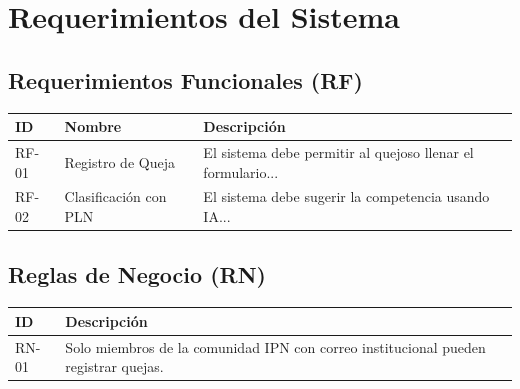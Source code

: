 \chapter{Requerimientos del Sistema}
\label{cap:requerimientos}

\section{Requerimientos Funcionales (RF)}
\begin{table}[htbp]
    \centering
    \begin{tabular}{|l|l|p{8cm}|}
    \hline
    \textbf{ID} & \textbf{Nombre} & \textbf{Descripción} \\ \hline
    \label{RF-01} RF-01 & Registro de Queja & El sistema debe permitir al quejoso llenar el formulario... \\ \hline
    \label{RF-02} RF-02 & Clasificación con PLN & El sistema debe sugerir la competencia usando IA... \\ \hline
    \end{tabular}
\end{table}

\section{Reglas de Negocio (RN)}
\begin{table}[htbp]
    \centering
    \begin{tabular}{|l|l|p{8cm}|}
    \hline
    \textbf{ID} & \textbf{Descripción} \\ \hline
    \label{RN-01} RN-01 & Solo miembros de la comunidad IPN con correo institucional pueden registrar quejas. \\ \hline
    \end{tabular}
\end{table}